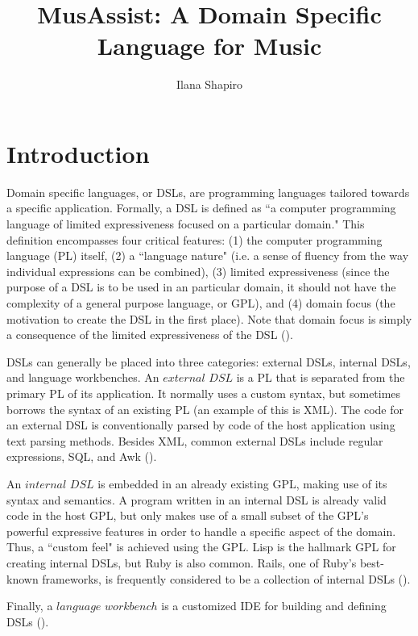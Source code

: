 \documentclass{report}
\title{MusAssist: A Domain Specific Language for Music }
\author{Ilana Shapiro}
\newcommand\citeparen[1]{(\cite{#1})}
\begin{document}
\maketitle

\tableofcontents
 
\chapter{Introduction}
Domain specific languages, or DSLs, are programming languages tailored towards a specific application. Formally, a DSL is defined as ``a computer programming language of limited expressiveness focused on a particular domain." This definition encompasses four critical features: (1) the computer programming language (PL) itself, (2) a ``language nature" (i.e. a sense of fluency from the way individual expressions can be combined), (3) limited expressiveness (since the purpose of a DSL is to be used in an particular domain, it should not have the complexity of a general purpose language, or GPL), and (4) domain focus (the motivation to create the DSL in the first place). Note that domain focus is  simply a consequence of the limited expressiveness of the DSL \citeparen{fowler_parsons_2011}.

DSLs can generally be placed into three categories: external DSLs, internal DSLs, and language workbenches. An $external$ $DSL$ is a PL that is separated  from the primary PL of its application. It normally uses a custom syntax, but sometimes borrows the syntax of an existing PL (an example of this is XML). The code for an external DSL is conventionally parsed by code of the host application using text parsing methods. Besides XML, common external DSLs include regular expressions, SQL, and Awk  \citeparen{fowler_parsons_2011}.

An $internal$ $DSL$ is embedded in an already existing GPL, making use  of its  syntax and semantics. A program written in an internal DSL is already valid code in the host GPL, but only makes use of a small subset of the GPL's powerful expressive features in order to handle a specific aspect of the domain. Thus, a ``custom feel" is achieved using the GPL. Lisp is the hallmark GPL for creating internal DSLs, but Ruby is also common. Rails, one of Ruby's best-known frameworks, is frequently considered to be a collection of internal DSLs   \citeparen{fowler_parsons_2011}.

Finally, a $ language$ $workbench$ is a customized IDE for building and defining DSLs \citeparen{fowler_parsons_2011}. 
\end{document}
